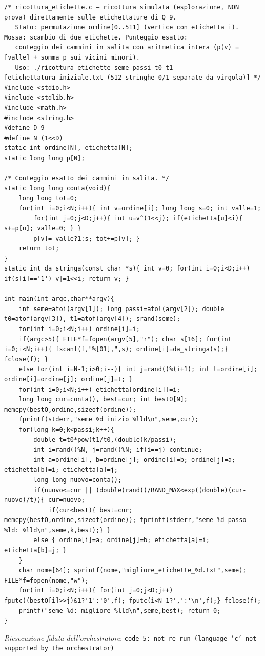 \documentclass[11pt,a4paper]{article}
\begin{document}
\begin{lstlisting}[caption={attempt\_001 code\_5 [c, rigore exact] — Simulated annealing (exploration only) directly on labellings of Q\_9: swap two labels, exa — verdetto del Referee: REJECT}]
/* ricottura_etichette.c — ricottura simulata (esplorazione, NON prova) direttamente sulle etichettature di Q_9.
   Stato: permutazione ordine[0..511] (vertice con etichetta i). Mossa: scambio di due etichette. Punteggio esatto:
   conteggio dei cammini in salita con aritmetica intera (p(v) = [valle] + somma p sui vicini minori).
   Uso: ./ricottura_etichette seme passi t0 t1 [etichettatura_iniziale.txt (512 stringhe 0/1 separate da virgola)] */
#include <stdio.h>
#include <stdlib.h>
#include <math.h>
#include <string.h>
#define D 9
#define N (1<<D)
static int ordine[N], etichetta[N];
static long long p[N];

/* Conteggio esatto dei cammini in salita. */
static long long conta(void){
    long long tot=0;
    for(int i=0;i<N;i++){ int v=ordine[i]; long long s=0; int valle=1;
        for(int j=0;j<D;j++){ int u=v^(1<<j); if(etichetta[u]<i){ s+=p[u]; valle=0; } }
        p[v]= valle?1:s; tot+=p[v]; }
    return tot;
}
static int da_stringa(const char *s){ int v=0; for(int i=0;i<D;i++) if(s[i]=='1') v|=1<<i; return v; }

int main(int argc,char**argv){
    int seme=atoi(argv[1]); long passi=atol(argv[2]); double t0=atof(argv[3]), t1=atof(argv[4]); srand(seme);
    for(int i=0;i<N;i++) ordine[i]=i;
    if(argc>5){ FILE*f=fopen(argv[5],"r"); char s[16]; for(int i=0;i<N;i++){ fscanf(f,"%[01],",s); ordine[i]=da_stringa(s);} fclose(f); }
    else for(int i=N-1;i>0;i--){ int j=rand()%(i+1); int t=ordine[i]; ordine[i]=ordine[j]; ordine[j]=t; }
    for(int i=0;i<N;i++) etichetta[ordine[i]]=i;
    long long cur=conta(), best=cur; int bestO[N]; memcpy(bestO,ordine,sizeof(ordine));
    fprintf(stderr,"seme %d inizio %lld\n",seme,cur);
    for(long k=0;k<passi;k++){
        double t=t0*pow(t1/t0,(double)k/passi);
        int i=rand()%N, j=rand()%N; if(i==j) continue;
        int a=ordine[i], b=ordine[j]; ordine[i]=b; ordine[j]=a; etichetta[b]=i; etichetta[a]=j;
        long long nuovo=conta();
        if(nuovo<=cur || (double)rand()/RAND_MAX<exp((double)(cur-nuovo)/t)){ cur=nuovo;
            if(cur<best){ best=cur; memcpy(bestO,ordine,sizeof(ordine)); fprintf(stderr,"seme %d passo %ld: %lld\n",seme,k,best);} }
        else { ordine[i]=a; ordine[j]=b; etichetta[a]=i; etichetta[b]=j; }
    }
    char nome[64]; sprintf(nome,"migliore_etichette_%d.txt",seme); FILE*f=fopen(nome,"w");
    for(int i=0;i<N;i++){ for(int j=0;j<D;j++) fputc((bestO[i]>>j)&1?'1':'0',f); fputc(i<N-1?',':'\n',f);} fclose(f);
    printf("seme %d: migliore %lld\n",seme,best); return 0;
}

\end{lstlisting}
\noindent\emph{Riesecuzione fidata dell'orchestratore}: \texttt{code\_5: not re-run (language 'c' not supported by the orchestrator)}
\end{document}
